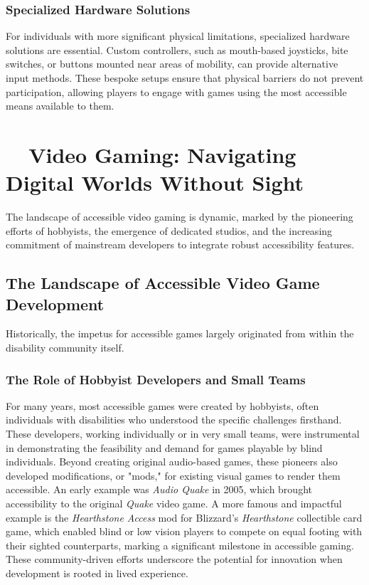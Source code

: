 \subsubsection{Specialized Hardware Solutions}

For individuals with more significant physical limitations, specialized hardware solutions are essential. Custom controllers, such as mouth-based joysticks, bite switches, or buttons mounted near areas of mobility, can provide alternative input methods\supercite{LighthouseGuild2025}. These bespoke setups ensure that physical barriers do not prevent participation, allowing players to engage with games using the most accessible means available to them.

\section{~~Video Gaming: Navigating Digital Worlds Without Sight}

The landscape of accessible video gaming is dynamic, marked by the pioneering efforts of hobbyists, the emergence of dedicated studios, and the increasing commitment of mainstream developers to integrate robust accessibility features.

\subsection{The Landscape of Accessible Video Game Development}

Historically, the impetus for accessible games largely originated from within the disability community itself.

\subsubsection{The Role of Hobbyist Developers and Small Teams}

For many years, most accessible games were created by hobbyists, often individuals with disabilities who understood the specific challenges firsthand. These developers, working individually or in very small teams, were instrumental in demonstrating the feasibility and demand for games playable by blind individuals\supercite{AFBIntroVG}. Beyond creating original audio-based games, these pioneers also developed modifications, or "mods," for existing visual games to render them accessible. An early example was \textit{Audio Quake} in 2005, which brought accessibility to the original \textit{Quake} video game. A more famous and impactful example is the \textit{Hearthstone Access} mod for Blizzard's \textit{Hearthstone} collectible card game, which enabled blind or low vision players to compete on equal footing with their sighted counterparts, marking a significant milestone in accessible gaming\supercite{AFBIntroVG}. These community-driven efforts underscore the potential for innovation when development is rooted in lived experience.

